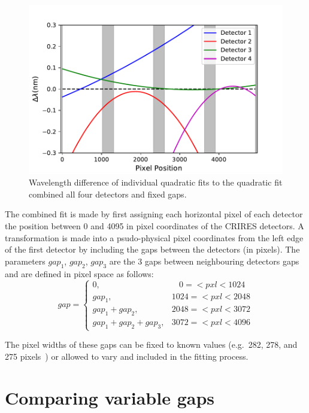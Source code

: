 \begin{figure}
    \centering
    \includegraphics[width=0.7\linewidth]{./figures/appendix/difference_combined_wav_fit}
    \caption[Difference of multi-detector combined fit to the individual calibration mappings.]{Wavelength difference of individual quadratic fits to the quadratic fit combined all four detectors and fixed gaps.}
    \label{fig:multidectorfitdiff}
\end{figure}

The combined fit is made by first assigning each horizontal pixel of each detector the position between 0 and 4095 in pixel coordinates of the {CRIRES} detectors.
A transformation is made into a psudo-physical pixel coordinates from the left edge of the first detector by including the gaps between the detectors (in pixels).
The parameters \(gap_{1}\), \(gap_{2}\), \(gap_{3}\) are the 3 gaps between neighbouring detectors gaps and are defined in pixel space as follows:
\[
gap =\begin{cases}
0,                       & ~~~~0=<pxl<1024\\
gap_1,                    & 1024=<pxl<2048\\
gap_1 + gap_2,             & 2048=<pxl<3072\\
gap_1 + gap_2 + gap_3,      & 3072=<pxl<4096
\end{cases}
\]

The pixel widths of these gaps can be fixed to known values (e.g.\ 282, 278, and 275 pixels~\citep{brogi_rotation_2016}) or allowed to vary and included in the fitting process.


\section{Comparing variable gaps}


